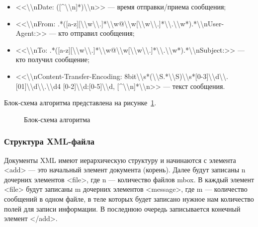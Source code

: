 \begin{itemize}
  \item <<\textbackslash \textbackslash nDate: ([\textasciicircum \textbackslash \textbackslash n]*)\textbackslash \textbackslash n>> --- время отправки/приема сообщения;
  
  \item <<\textbackslash \textbackslash nFrom: .*([a-z][\textbackslash \textbackslash w\textbackslash \textbackslash .]*\textbackslash \textbackslash w@\textbackslash \textbackslash w[\textbackslash \textbackslash w\textbackslash \textbackslash .]*\textbackslash \textbackslash .\textbackslash \textbackslash w*).*\textbackslash \textbackslash nUser-Agent:>> --- кто отправил сообщения;
  
  \item <<\textbackslash \textbackslash nTo: .*([a-z][\textbackslash \textbackslash w\textbackslash \textbackslash .]*\textbackslash \textbackslash w@\textbackslash \textbackslash w[\textbackslash \textbackslash w\textbackslash \textbackslash .]*\textbackslash \textbackslash .\textbackslash \textbackslash w*).*\textbackslash \textbackslash nSubject:>> --- кто получил сообщение;
  
  \item <<\textbackslash \textbackslash nContent-Transfer-Encoding: 8bit\textbackslash \textbackslash s*(\textbackslash \textbackslash S.*\textbackslash \textbackslash S)\textbackslash \textbackslash s*[0-3]\textbackslash \textbackslash d\textbackslash \textbackslash .[01]\textbackslash \textbackslash d\textbackslash \textbackslash .\textbackslash \textbackslash d{4} [0-2]\textbackslash \textbackslash d:[0-5]\textbackslash \textbackslash d, [\textasciicircum \textbackslash \textbackslash n]*\textbackslash \textbackslash n>> --- текст сообщения.
\end{itemize}

Блок-схема алгоритма представлена на рисунке~\ref{teresh_1:teresh_1}.

\begin{figure}[h!]
\caption{Блок-схема алгоритма}
\label{teresh_1:teresh_1}
\end{figure}

\subsubsection{Структура XML-файла}

Документы XML имеют иерархическую структуру и начинаются с элемента <add> --- это начальный элемент документа (корень). Далее будут записаны n дочерних элементов <file>, где n --- количество файлов mbox. В каждый элемент <file> будут записаны m дочерних элементов <message>, где m --- количество сообщений в одном файле, в теле которых будет записано нужное нам количество полей для записи информации. В последнюю очередь записывается конечный элемент </add>.


